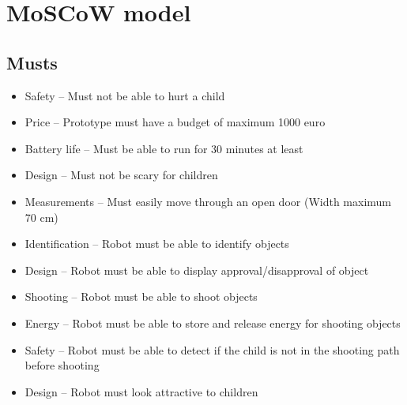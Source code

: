 \documentclass[11pt,twoside,a4paper]{report}
\begin{document}
\begin{appendices}
\begin{usecase}
\end{usecase}

\begin{usecase}
\end{usecase}
\label{appendix:usecase}

\chapter{MoSCoW model}
\label{appendix:moscow}
\section{Musts}
\begin{itemize}
\item Safety --         Must not be able to hurt a child
\item Price --             Prototype must have a budget of maximum 1000 euro
\item Battery life --         Must be able to run for 30 minutes at least
\item Design --        Must not be scary for children
\item Measurements --     Must easily move through an open door (Width maximum 70 cm)
\item Identification --        Robot must be able to identify objects
\item Design --       Robot must be able to display approval/disapproval of object
\item Shooting --        Robot must be able to shoot objects
\item Energy --         Robot must be able to store and release energy for shooting objects
\item Safety --        Robot must be able to detect if the child is not in the shooting path before shooting
\item Design --         Robot must look attractive to children
\end{itemize}

\end{appendices}
\end{document}

